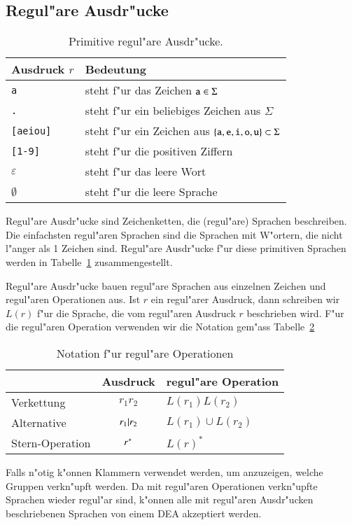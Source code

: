 \subsection{Regul"are Ausdr"ucke}
\begin{table}
\begin{center}
\begin{tabular}{|l|l|}
\hline
Ausdruck $r$&Bedeutung\\
\hline
{\tt a}&steht f"ur das Zeichen ${\tt a}\in \Sigma$\\
{\tt .}&steht f"ur ein beliebiges Zeichen aus $\Sigma$\\
{\tt [aeiou]}&steht f"ur ein Zeichen aus $\{{\tt a},{\tt e},{\tt i},{\tt o},{\tt u}\}\subset \Sigma$\\
{\tt [1-9]}&steht f"ur die positiven Ziffern\\
$\varepsilon$&steht f"ur das leere Wort\\
$\emptyset$&steht f"ur die leere Sprache\\
\hline
\end{tabular}
\end{center}
\caption{Primitive regul"are Ausdr"ucke.\label{regtab1}}
\end{table}
Regul"are Ausdr"ucke sind Zeichenketten, die (regul"are) Sprachen
beschreiben. 
Die einfachsten regul"aren Sprachen sind die Sprachen mit W"ortern,
die nicht l"anger als 1 Zeichen sind. Regul"are Ausdr"ucke f"ur
diese primitiven Sprachen werden in Tabelle~\ref{regtab1} zusammengestellt.

Regul"are Ausdr"ucke bauen regul"are Sprachen aus einzelnen
Zeichen und regul"aren Operationen aus.
Ist $r$ ein regul"arer Ausdruck, dann schreiben wir  $L(r)$ f"ur die
Sprache, die vom regul"aren Ausdruck $r$ beschrieben wird.
F"ur die regul"aren Operation verwenden wir die Notation
gem"ass Tabelle~\ref{regtab2}
\begin{table}
\begin{center}
\begin{tabular}{|l|c|l|}
\hline
&Ausdruck&regul"are Operation\\
\hline
\index{Verkettung}
Verkettung&$r_1r_2$&$L(r_1)L(r_2)$\\
\index{Alternative}
Alternative&$r_1{\tt |}r_2$&$L(r_1)\cup L(r_2)$\\
\index{*-Operation@$*$-Operation}
Stern-Operation&$r{\mathstrut^{\tt *}}$&$L(r)^*$\\
\hline
\end{tabular}
\end{center}
\caption{Notation f"ur regul"are Operationen\label{regtab2}}
\end{table}
Falls n"otig k"onnen Klammern verwendet werden, um anzuzeigen,
welche Gruppen verkn"upft werden. Da mit regul"aren Operationen
verkn"upfte Sprachen wieder regul"ar sind, k"onnen alle mit
regul"aren Ausdr"ucken beschriebenen Sprachen von einem DEA
akzeptiert werden.

